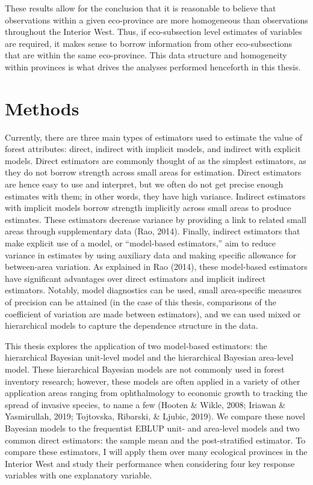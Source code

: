 \documentclass[12pt,twoside]{reedthesis}
\begin{document}
These results allow for the conclusion that it is reasonable to believe that observations within a given eco-province are more homogeneous than observations throughout the Interior West. Thus, if eco-subsection level estimates of variables are required, it makes sense to borrow information from other eco-subsections that are within the same eco-province. This data structure and homogeneity within provinces is what drives the analyses performed henceforth in this thesis.

\hypertarget{methods}{%
\chapter{Methods}\label{methods}}

Currently, there are three main types of estimators used to estimate the value of forest attributes: direct, indirect with implicit models, and indirect with explicit models. Direct estimators are commonly thought of as the simplest estimators, as they do not borrow strength across small areas for estimation. Direct estimators are hence easy to use and interpret, but we often do not get precise enough estimates with them; in other words, they have high variance. Indirect estimators with implicit models borrow strength implicitly across small areas to produce estimates. These estimators decrease variance by providing a link to related small areas through supplementary data (Rao, 2014). Finally, indirect estimators that make explicit use of a model, or ``model-based estimators,'' aim to reduce variance in estimates by using auxiliary data and making specific allowance for between-area variation. As explained in Rao (2014), these model-based estimators have significant advantages over direct estimators and implicit indirect estimators. Notably, model diagnostics can be used, small area-specific measures of precision can be attained (in the case of this thesis, comparisons of the coefficient of variation are made between estimators), and we can used mixed or hierarchical models to capture the dependence structure in the data.

This thesis explores the application of two model-based estimators: the hierarchical Bayesian unit-level model and the hierarchical Bayesian area-level model. These hierarchical Bayesian models are not commonly used in forest inventory research; however, these models are often applied in a variety of other application areas ranging from ophthalmology to economic growth to tracking the spread of invasive species, to name a few (Hooten \& Wikle, 2008; Iriawan \& Yasmirullah, 2019; Tojtovska, Ribarski, \& Ljubic, 2019). We compare these novel Bayesian models to the frequentist EBLUP unit- and area-level models and two common direct estimators: the sample mean and the post-stratified estimator. To compare these estimators, I will apply them over many ecological provinces in the Interior West and study their performance when considering four key response variables with one explanatory variable.
\end{document}
